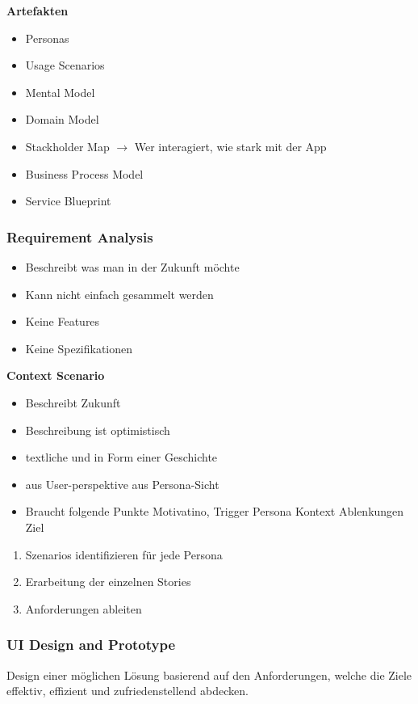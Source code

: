 \documentclass{report}
\theoremstyle{definition}
\theoremstyle{example}
\begin{document}
\textbf{Artefakten}
\begin{itemize}
   \item Personas
   \item Usage Scenarios
   \item Mental Model
   \item Domain Model
   \item Stackholder Map $\rightarrow$ Wer interagiert, wie stark mit der App
   \item Business Process Model
   \item Service Blueprint
\end{itemize}

\subsubsection{Requirement Analysis}
\begin{itemize}
   \item Beschreibt was man in der Zukunft möchte
   \item Kann nicht einfach gesammelt werden
   \item Keine Features
   \item Keine Spezifikationen
\end{itemize}

\textbf{Context Scenario}\\
\begin{itemize}
   \item Beschreibt Zukunft 
   \item Beschreibung ist optimistisch
   \item textliche und in Form einer Geschichte
   \item aus User-perspektive aus Persona-Sicht
   \item Braucht folgende Punkte
   \subitem Motivatino, Trigger
   \subitem Persona
   \subitem Kontext
   \subitem Ablenkungen
   \subitem Ziel
\end{itemize}

\begin{enumerate}
   \item Szenarios identifizieren für jede Persona
   \item Erarbeitung der einzelnen Stories
   \item Anforderungen ableiten
\end{enumerate}

\subsubsection{UI Design and Prototype}
Design einer möglichen Lösung basierend auf den Anforderungen, welche die Ziele effektiv, effizient und zufriedenstellend abdecken.
\end{document}
